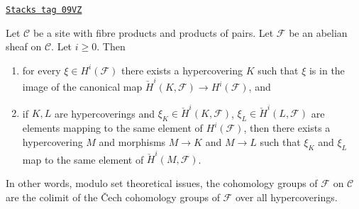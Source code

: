 \begin{proposition}
\label{hypercovering-proposition-cohomology-hypercoverings}
\href{https://stacks.math.columbia.edu/tag/09VZ}{\texttt{Stacks tag 09VZ}}

Let $\mathcal{C}$ be a site with fibre products and products of pairs.
Let $\mathcal{F}$ be an abelian sheaf on $\mathcal{C}$.
Let $i \geq 0$. Then
\begin{enumerate}
\item for every $\xi \in H^i(\mathcal{F})$ there exists a hypercovering
$K$ such that $\xi$ is in the image of the canonical map
$\check{H}^i(K, \mathcal{F}) \to H^i(\mathcal{F})$, and
\item if $K, L$ are hypercoverings and $\xi_K \in \check{H}^i(K, \mathcal{F})$,
$\xi_L \in \check{H}^i(L, \mathcal{F})$ are elements mapping
to the same element of $H^i(\mathcal{F})$, then there exists
a hypercovering $M$ and morphisms $M \to K$ and $M \to L$ such
that $\xi_K$ and $\xi_L$ map to the same element of
$\check{H}^i(M, \mathcal{F})$.
\end{enumerate}
In other words, modulo set theoretical issues, the cohomology
groups of $\mathcal{F}$ on $\mathcal{C}$ are the colimit of
the {\v C}ech cohomology groups of $\mathcal{F}$ over all hypercoverings.
\end{proposition}

